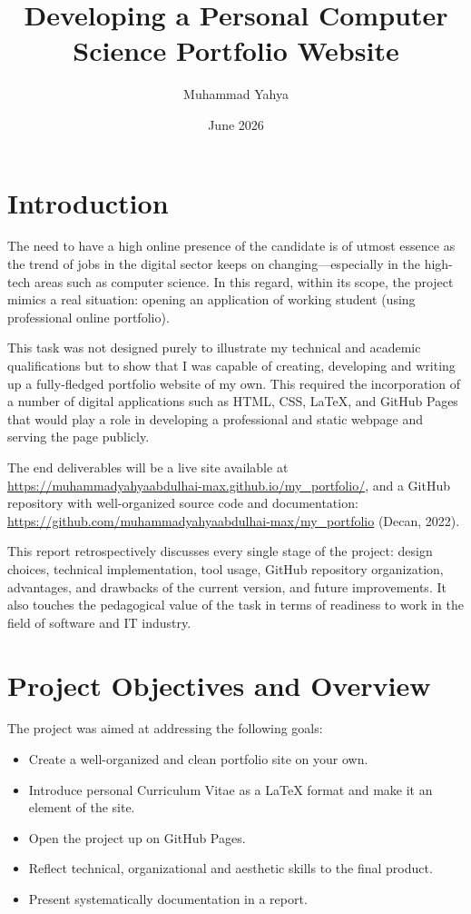 \documentclass[11pt,a4paper]{article}
\title{\textbf{Developing a Personal Computer Science Portfolio Website}}
\author{Muhammad Yahya}
\date{June 2026}
\begin{document}
\maketitle

\section*{Introduction}

The need to have a high online presence of the candidate is of utmost essence as the trend of jobs in the digital sector keeps on changing—especially in the high-tech areas such as computer science. In this regard, within its scope, the project mimics a real situation: opening an application of working student (using professional online portfolio).

This task was not designed purely to illustrate my technical and academic qualifications but to show that I was capable of creating, developing and writing up a fully-fledged portfolio website of my own. This required the incorporation of a number of digital applications such as HTML, CSS, LaTeX, and GitHub Pages that would play a role in developing a professional and static webpage and serving the page publicly.

The end deliverables will be a live site available at \url{https://muhammadyahyaabdulhai-max.github.io/my_portfolio/}, and a GitHub repository with well-organized source code and documentation: \url{https://github.com/muhammadyahyaabdulhai-max/my_portfolio} (Decan, 2022).

This report retrospectively discusses every single stage of the project: design choices, technical implementation, tool usage, GitHub repository organization, advantages, and drawbacks of the current version, and future improvements. It also touches the pedagogical value of the task in terms of readiness to work in the field of software and IT industry.

\section*{Project Objectives and Overview}

The project was aimed at addressing the following goals:

\begin{itemize}
    \item Create a well-organized and clean portfolio site on your own.
    \item Introduce personal Curriculum Vitae as a LaTeX format and make it an element of the site.
    \item Open the project up on GitHub Pages.
    \item Reflect technical, organizational and aesthetic skills to the final product.
    \item Present systematically documentation in a report.
\end{itemize}
\end{document}
